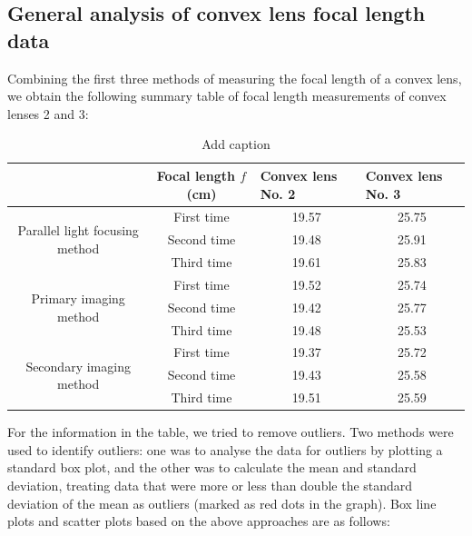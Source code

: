 \documentclass[UTF8]{article}
\begin{document}
    \subsection{General analysis of convex lens focal length data}
    Combining the first three methods of measuring the focal length of a convex lens, we obtain the following summary table of focal length measurements of convex lenses 2 and 3:
    \begin{table}[H]
          \centering
          \caption{Add caption}
            \begin{tabular}{cccc}
            \toprule[2pt]
                  & Focal length $f$(cm) & \multicolumn{1}{l}{Convex lens No. 2} & \multicolumn{1}{l}{Convex lens No. 3} \\
                  \midrule
             \multirow{3}[4]{*}{Parallel light focusing method} & First time & 19.57 & 25.75 \\
             \cmidrule{2-4}     & Second time & 19.48 & 25.91 \\
             \cmidrule{2-4}     & Third time & 19.61 & 25.83 \\
                  \midrule
             \multirow{3}[4]{*}{Primary imaging method} & First time & 19.52 & 25.74 \\
             \cmidrule{2-4}     & Second time & 19.42 & 25.77 \\
              \cmidrule{2-4}    & Third time & 19.48 & 25.53 \\
                  \midrule
            \multirow{3}[4]{*}{Secondary imaging method} & First time & 19.37 & 25.72 \\
              \cmidrule{2-4}    & Second time & 19.43 & 25.58 \\
             \cmidrule{2-4}     & Third time & 19.51 & 25.59 \\
                   \bottomrule[2pt]
            \end{tabular}%
          \label{tab:addlabel}%
        \end{table}%
        
        For the information in the table, we tried to remove outliers. Two methods were used to identify outliers: one was to analyse the data for outliers by plotting a standard box plot, and the other was to calculate the mean and standard deviation, treating data that were more or less than double the standard deviation of the mean as outliers (marked as red dots in the graph). Box line plots and scatter plots based on the above approaches are as follows:
        
\end{document}
